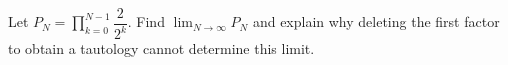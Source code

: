 Let $P_N=\prod_{k=0}^{N-1}\dfrac{2}{2^k}$. Find $\lim_{N\to\infty}P_N$ and explain why deleting the first factor to obtain a tautology cannot determine this limit.
